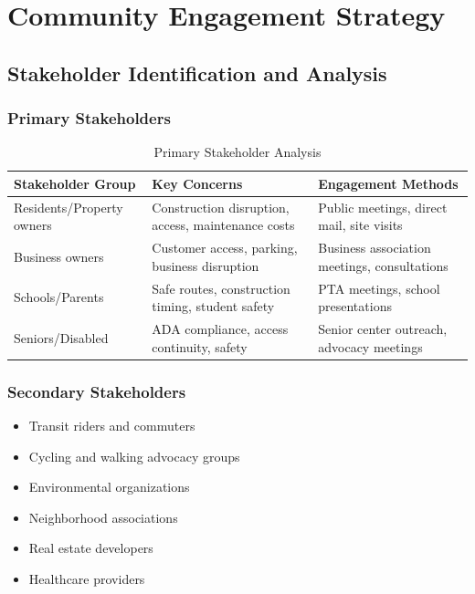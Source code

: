 \documentclass[11pt,letterpaper]{article}
\begin{document}
\section{Community Engagement Strategy}

\subsection{Stakeholder Identification and Analysis}

\subsubsection{Primary Stakeholders}
\begin{table}[h]
\centering
\caption{Primary Stakeholder Analysis}
\begin{tabular}{p{3cm}p{4cm}p{4cm}}
\toprule
\textbf{Stakeholder Group} & \textbf{Key Concerns} & \textbf{Engagement Methods} \\
\midrule
Residents/Property owners & Construction disruption, access, maintenance costs & Public meetings, direct mail, site visits \\
Business owners & Customer access, parking, business disruption & Business association meetings, consultations \\
Schools/Parents & Safe routes, construction timing, student safety & PTA meetings, school presentations \\
Seniors/Disabled & ADA compliance, access continuity, safety & Senior center outreach, advocacy meetings \\
\bottomrule
\end{tabular}
\end{table}

\subsubsection{Secondary Stakeholders}
\begin{itemize}
    \item Transit riders and commuters
    \item Cycling and walking advocacy groups
    \item Environmental organizations
    \item Neighborhood associations
    \item Real estate developers
    \item Healthcare providers
\end{itemize}
\end{document}
